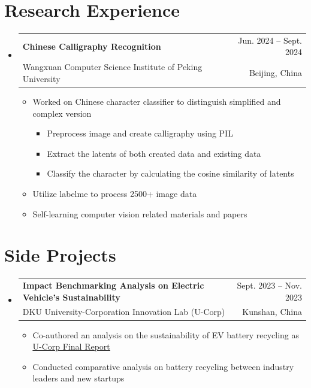 \documentclass[letterpaper,11pt]{article}
\makeatletter
\newcommand{\CVItem}[1]{
  \item\small{
    {#1 \vspace{-2pt}}
  }
}
\newcommand{\CVSubheading}[4]{
  \vspace{-2pt}\item
    \begin{tabular*}{0.97\textwidth}[t]{l@{\extracolsep{\fill}}r}
      \textbf{#1} & #2 \\
      \small#3 & \small #4 \\
    \end{tabular*}\vspace{-7pt}
}
\newcommand{\CVSubHeadingListStart}{\begin{itemize}[leftmargin=0.5cm, label={}]}
\newcommand{\CVSubHeadingListEnd}{\end{itemize}}
\newcommand{\CVItemListStart}{\begin{itemize}}
\newcommand{\CVItemListEnd}{\end{itemize}\vspace{-5pt}}
\makeatother
\begin{document}

\section{Research Experience}
  \CVSubHeadingListStart
    \CVSubheading
      {Chinese Calligraphy Recognition}{Jun. 2024 -- Sept. 2024}
      {Wangxuan Computer Science Institute of Peking University}{Beijing, China}
      \CVItemListStart
        \CVItem{Worked on Chinese character classifier to distinguish simplified and complex version}
        \CVItemListStart
        \CVItem{Preprocess image and create calligraphy using PIL}
        \CVItem{Extract the latents of both created data and existing data}
        \CVItem{Classify the character by calculating the cosine similarity of latents}
      \CVItemListEnd
        \CVItem{Utilize labelme to process 2500+ image data}
        \CVItem{Self-learning computer vision related materials and papers}
      \CVItemListEnd
  \CVSubHeadingListEnd






\section{Side Projects}
  \CVSubHeadingListStart
    \CVSubheading
      {{Impact Benchmarking Analysis on Electric Vehicle’s Sustainability} }{Sept. 2023 -- Nov. 2023}
      {DKU University-Corporation Innovation Lab (U-Corp)}{Kunshan, China}
       \CVItemListStart
        \CVItem{Co-authored an analysis on the sustainability of EV battery recycling as \href{https://ine.dukekunshan.edu.cn/project/23f-u-corp-impact-bread/#1709088351127-4a381d9f-3e83}{\underline{U-Corp Final Report}}}
        \CVItem{Conducted comparative analysis on battery recycling between industry leaders and new startups }
    \CVItemListEnd
    
  \CVSubHeadingListEnd

\iffalse

\end{document}
